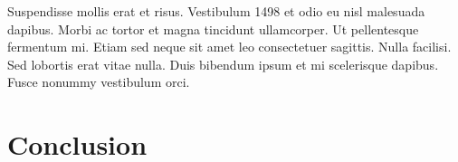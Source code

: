 \begin{savequote}[90mm]
  {\QuoteFont  Suspendisse mollis erat et risus. Vestibulum
  1498 et odio eu nisl malesuada dapibus. Morbi ac tortor et magna
tincidunt ullamcorper. Ut pellentesque fermentum mi. Etiam sed neque
sit amet leo consectetuer sagittis. Nulla facilisi. Sed lobortis
erat vitae nulla. Duis bibendum ipsum et mi scelerisque dapibus.
Fusce nonummy vestibulum orci.}
\end{savequote}


\chapter{Conclusion}
\label{chap:conclusion}

\lipsum[10-12]
